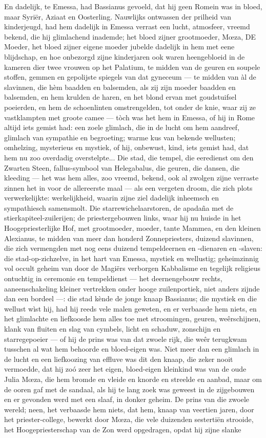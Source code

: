 \documentclass[a4paper, 12pt, oneside, dutch]{article}
\begin{document}
En dadelijk, te Emessa, had Bassianus gevoeld, dat hij geen Romein was in bloed, maar Syriër, Aziaat en Oosterling. Nauwlijks ontwassen der prilheid van kinderjeugd, had hem dadelijk in Emessa verrast een lucht, atmosfeer, vreemd bekend, die hij glimlachend inademde; het bloed zijner grootmoeder, Mœza, DE Moeder, het bloed zijner eigene moeder jubelde dadelijk in hem met eene blijdschap, en hoe onbezorgd zijne kinderjaren ook waren heengebloeid in de kameren dier twee vrouwen op het Palatium, te midden van de geuren en soupele stoffen, gemmen en gepolijste spiegels van dat gyneceum --- te midden van àl de slavinnen, die hèm baadden en balsemden, als zij zijn moeder baadden en balsemden, en hem krulden de haren, en het blond ervan met goudstuifsel poeierden, en hem de schoenlinten omstrengelden, tot onder de knie, waar zij ze vastklampten met groote camee --- tòch was het hem in Emessa, of hij in Rome altijd iets gemist had: een zoele glimlach, die in de lucht om hem aandreef, glimlach van sympathie en begroeting; warme kus van bekende wellusten; omhelzing, mysterieus en mystiek, of hij, onbewust, kind, iets gemist had, dat hem nu zoo overdadig overstelpte... Die stad, die tempel, die eeredienst om den Zwarten Steen, fallus-symbool van Helegabalus, die geuren, die dansen, die kleeding --- het was hem alles, zoo vreemd, bekend, ook al zwolgen zijne verraste zinnen het in voor de allereerste maal --- als een vergeten droom, die zich plots verwerkelijkte: werkelijkheid, waarin zijne ziel dadelijk inheemsch en sympathiesch samensmolt. Die starrewichelaarstoren, de apadaña met de stierkapiteel-zuilerijen; de priestergebouwen links, waar hij nu huisde in het Hoogepriesterlijke Hof, met grootmoeder, moeder, tante Mammea, en den kleinen Alexianus, te midden van meer dan honderd Zonnepriesters, duizend slavinnen, die zich vermengden met nog eens duizend tempeldeernen en -dienaren en -slaven: die stad-op-zichzelve, in het hart van Emessa, mystiek en wellustig; geheimzinnig vol occult geheim van door de Magiërs verborgen Kabbalisme en tegelijk religieus ontuchtig in ceremonie en tempeldienst --- het deernengebouw rechts, aaneenschakeling kleiner vertrekken onder hooge zuilenportiek, niet anders zijnde dan een bordeel ---: die stad kènde de jonge knaap Bassianus; die mystiek en die wellust wìst hij, had hij reeds vele malen geweten, en er verbaasde hem niets, en het glimlachte en liefkoosde hem alles toe met stroomingen, geuren, weêrschijnen, klank van fluiten en slag van cymbels, licht en schaduw, zonschijn en starregepoeier --- of hij de prins was van dat zwoele rijk, die weêr terugkwam tusschen al wat hem behoorde en bloed-eigen was. Niet meer dan een glimlach in de lucht en een liefkoozing van effluve was dit den knaap, die zeker nooit vermoedde, dat hij zoó zeer het eigen, bloed-eigen kleinkind was van de oude Julia Mœza, die hem bromde en vleide en knorde en streelde en aanbad, maar om de ooren gaf met de sandaal, als hij te lang zoek was geweest in de zijgebouwen en er gevonden werd met een slaaf, in donker geheim. De prins van die zwoele wereld; neen, het verbaasde hem niets, dat hem, knaap van veertien jaren, door het priester-college, bewerkt door Mœza, die vele duizenden sestertiën strooide, het Hoogepriesterschap van de Zon werd opgedragen, opdat hij zijne slanke 
\end{document}
